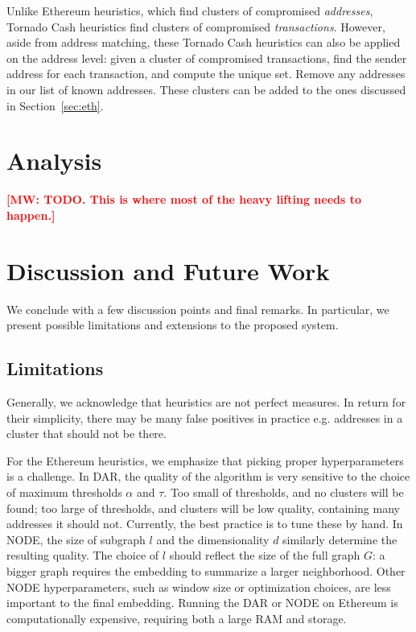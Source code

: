 \documentclass[11pt,a4paper]{article}
\newcommand{\mike}[1]{\textcolor{red}{\bf [MW: #1]}}
\begin{document}
Unlike Ethereum heuristics, which find clusters of compromised \textit{addresses}, Tornado Cash heuristics find clusters of compromised \textit{transactions}. However, aside from address matching, these Tornado Cash heuristics can also be applied on the address level: given a cluster of compromised transactions, find the sender address for each transaction, and compute the unique set. Remove any addresses in our list of known addresses. These clusters can be added to the ones discussed in Section~\ref{sec:eth}.

\section{Analysis}

\mike{TODO. This is where most of the heavy lifting needs to happen.}

\section{Discussion and Future Work}

We conclude with a few discussion points and final remarks. In particular, we present possible limitations and extensions to the proposed system.

\subsection{Limitations}

Generally, we acknowledge that heuristics are not perfect measures. In return for their simplicity, there may be many false positives in practice e.g. addresses in a cluster that should not be there.

For the Ethereum heuristics, we emphasize that picking proper hyperparameters is a challenge. In DAR, the quality of the algorithm is very sensitive to the choice of maximum thresholds $\alpha$ and $\tau$. Too small of thresholds, and no clusters will be found; too large of thresholds, and clusters will be low quality, containing many addresses it should not. Currently, the best practice is to tune these by hand. In NODE, the size of subgraph $l$ and the dimensionality $d$ similarly determine the resulting quality. The choice of $l$ should reflect the size of the full graph $G$: a bigger graph requires the embedding to summarize a larger neighborhood. Other NODE hyperparameters, such as window size or optimization choices, are less important to the final embedding. Running the DAR or NODE on Ethereum is computationally expensive, requiring both a large RAM and storage.
\end{document}
